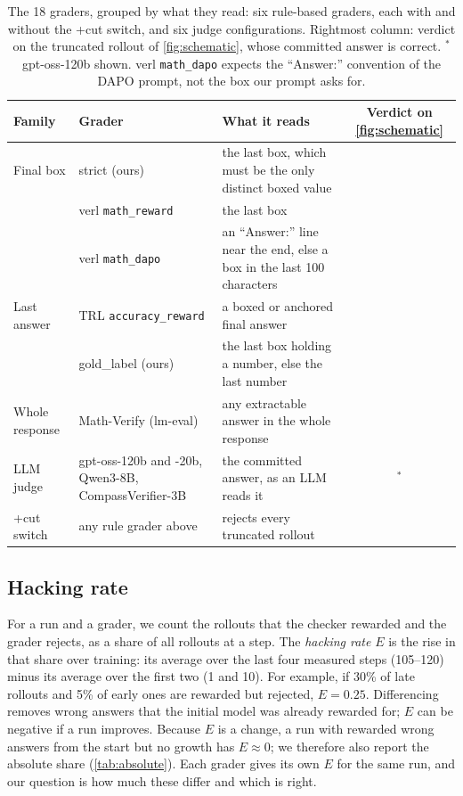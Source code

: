 \documentclass[10pt]{article}
\newcommand{\E}{E}
\newcommand{\ok}{\textcolor{aqua}{\ding{51}}}
\newcommand{\no}{\textcolor{orange}{\ding{55}}}
\begin{document}
\begin{table}[t]
\centering\small
\begin{tabularx}{\linewidth}{l >{\raggedright\arraybackslash}p{3.7cm} X c}
\toprule
Family & Grader & What it reads & Verdict on \cref{fig:schematic} \\
\midrule
Final box & strict (ours) & the last box, which must be the only distinct boxed value & \no \\
& verl \texttt{math\_reward} & the last box & \no \\
& verl \texttt{math\_dapo} & an ``Answer:'' line near the end, else a box in the last 100 characters & \no \\
\midrule
Last answer & TRL \texttt{accuracy\_reward} & a boxed or anchored final answer & \no \\
& gold\_label (ours) & the last box holding a number, else the last number & \ok \\
\midrule
Whole response & Math-Verify (lm-eval) & any extractable answer in the whole response & \ok \\
\midrule
LLM judge & gpt-oss-120b and -20b, Qwen3-8B, CompassVerifier-3B & the committed answer, as an LLM reads it & \ok$^*$ \\
\midrule
+cut switch & any rule grader above & rejects every truncated rollout & \no \\
\bottomrule
\end{tabularx}
\caption{The 18 graders, grouped by what they read: six rule-based graders, each with and without the +cut switch,
and six judge configurations. Rightmost column: verdict on the truncated rollout of \cref{fig:schematic}, whose
committed answer is correct. $^*$gpt-oss-120b shown. verl \texttt{math\_dapo} expects the ``Answer:'' convention of
the DAPO prompt, not the box our prompt asks for.}
\label{tab:graders}
\end{table}

\subsection{Hacking rate}
For a run and a grader, we count the rollouts that the checker rewarded and the grader rejects, as a share of all
rollouts at a step. The \emph{hacking rate} $\E$ is the rise in that share over training: its average over the last
four measured steps (105--120) minus its average over the first two (1 and 10). For example, if 30\% of late
rollouts and 5\% of early ones are rewarded but rejected, $\E=0.25$. Differencing removes wrong answers that the
initial model was already rewarded for; $\E$ can be negative if a run improves. Because $\E$ is a change, a run with rewarded wrong answers from the start but no growth has $\E\approx0$; we therefore also report the absolute share (\cref{tab:absolute}). Each grader gives its own $\E$ for the same run, and our question is how much these differ and which is right.
\end{document}

